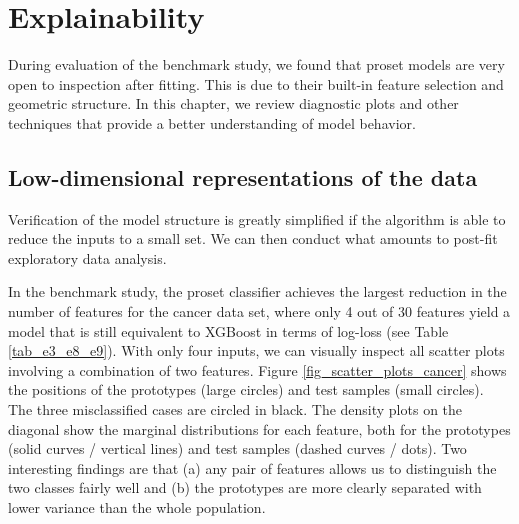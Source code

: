 \chapter{Explainability}
\label{ch_explainability}
%
\begin{center}\end{center}
%
During evaluation of the benchmark study, we found that proset models are very open to inspection after fitting.
This is due to their built-in feature selection and geometric structure.
In this chapter, we review diagnostic plots and other techniques that provide a better understanding of model behavior.
%
\section{Low-dimensional representations of the data}
\label{sec_low_dimensional}
%
Verification of the model structure is greatly simplified if the algorithm is able to reduce the inputs to a small set.
We can then conduct what amounts to post-fit exploratory data analysis.\par
%
In the benchmark study, the proset classifier achieves the largest reduction in the number of features for the cancer data set, where only 4 out of 30 features yield a model that is still equivalent to XGBoost in terms of log-loss (see Table \ref{tab_e3_e8_e9}).
With only four inputs, we can visually inspect all scatter plots involving a combination of two features.
Figure \ref{fig_scatter_plots_cancer} shows the positions of the prototypes (large circles) and test samples (small circles).
The three misclassified cases are circled in black.
The density plots on the diagonal show the marginal distributions for each feature, both for the prototypes (solid curves / vertical lines) and test samples (dashed curves / dots).
Two interesting findings are that (a) any pair of features allows us to distinguish the two classes fairly well and (b) the prototypes are more clearly separated with lower variance than the whole population.\par
%
